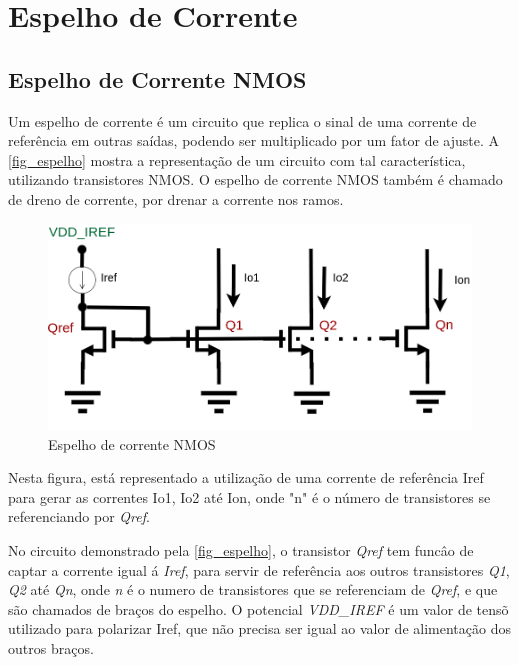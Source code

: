 \section{Espelho de Corrente}
\label{EspelhoCorrente}

\subsection{Espelho de Corrente NMOS}

Um espelho de corrente \'e um circuito que replica o sinal de uma corrente de refer\^encia em outras sa\'idas, podendo ser multiplicado por um fator de ajuste. A \autoref{fig_espelho} mostra a representa{\c c}\~ao de um circuito com tal caracter\'istica, utilizando transistores NMOS. O espelho de corrente NMOS tamb\'em \'e chamado de dreno de corrente, por drenar a corrente nos ramos.

\begin{figure}[htb]
    \label{fig_espelho}
    \centering
    \caption{Espelho de corrente NMOS} 
    \includegraphics[scale=0.4]{Circuitos/current_mirror_example.png}
\end{figure}

Nesta figura, est\'a representado a utiliza{\c c}\~ao de uma corrente de refer\^encia Iref para gerar as correntes Io1, Io2 at\'e Ion, onde "n" \'e o n\'umero de transistores se referenciando por \emph{Qref}.

No circuito demonstrado pela \autoref{fig_espelho}, o transistor \emph{Qref} tem func\^ao de captar a corrente igual \'a \emph{Iref}, para servir de refer\^encia aos outros transistores \emph{Q1}, \emph{Q2} at\'e \emph{Qn}, onde \emph{n} \'e o numero de transistores que se referenciam de \emph{Qref}, e que s\~ao chamados de bra{\c c}os do espelho. O potencial \emph{VDD\_IREF} \'e um valor de tens\~o utilizado para polarizar Iref, que n\~ao precisa ser igual ao valor de alimenta{\c c}\~ao dos outros bra{\c c}os.

